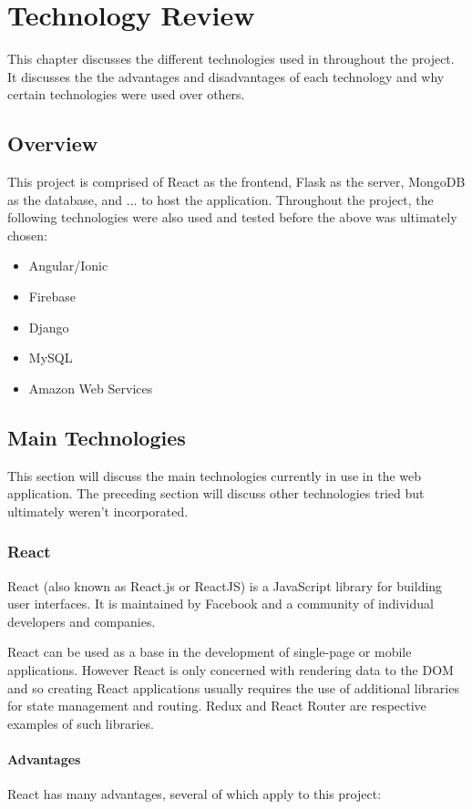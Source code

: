 \chapter{Technology Review}
This chapter discusses the different technologies used in throughout the project. It discusses the the advantages and disadvantages of each technology and why certain technologies were used over others.

\section{Overview}
This project is comprised of React as the frontend, Flask as the server, MongoDB as the database, and ... to host the application. Throughout the project, the following technologies were also used and tested before the above was ultimately chosen:
\begin{itemize}
    \item Angular/Ionic
    \item Firebase
    \item Django
    \item MySQL
    \item Amazon Web Services
\end{itemize}

\section{Main Technologies}
This section will discuss the main technologies currently in use in the web application. The preceding section will discuss other technologies tried but ultimately weren't incorporated. 

\newpage

\subsection{React}
React (also known as React.js or ReactJS) is a JavaScript library for building user interfaces. It is maintained by Facebook and a community of individual developers and companies.

React can be used as a base in the development of single-page or mobile applications. However React is only concerned with rendering data to the DOM and so creating React applications usually requires the use of additional libraries for state management and routing. Redux and React Router are respective examples of such libraries. 

\subsubsection{Advantages}
React has many advantages, several of which apply to this project:

